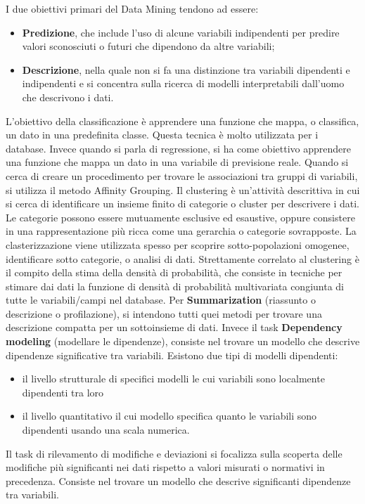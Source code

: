 \documentclass[a4paper]{extarticle}
\begin{document}
I due obiettivi primari del Data Mining tendono ad essere:

\begin{itemize}
\item \textbf{Predizione}, che include l'uso di alcune variabili indipendenti per predire valori sconosciuti o futuri che dipendono da altre variabili;
\item \textbf{Descrizione}, nella quale non si fa una distinzione tra variabili dipendenti e indipendenti e si concentra sulla ricerca di modelli interpretabili dall'uomo che descrivono i dati.
\end{itemize}

L'obiettivo della classificazione è apprendere una funzione che mappa, o classifica, un dato in una predefinita classe. Questa tecnica è molto utilizzata per i database. Invece quando si parla di regressione, si ha come obiettivo apprendere una funzione che mappa un dato in una variabile di previsione reale. Quando  si cerca di creare un procedimento per trovare le associazioni tra gruppi di variabili, si utilizza il metodo Affinity Grouping. Il clustering è un'attività descrittiva in cui si cerca di identificare un insieme finito di categorie o cluster per descrivere i dati. Le categorie possono essere mutuamente esclusive ed esaustive, oppure consistere in una rappresentazione più ricca come una gerarchia o categorie sovrapposte. La clasterizzazione viene utilizzata spesso per scoprire sotto-popolazioni omogenee, identificare sotto categorie, o analisi di dati. Strettamente correlato al clustering è il compito della stima della densità di probabilità, che consiste in tecniche per stimare dai dati la funzione di densità di probabilità multivariata congiunta di tutte le variabili/campi nel database.
Per \textbf{Summarization} (riassunto o descrizione o profilazione), si intendono tutti quei metodi per trovare una descrizione compatta per un sottoinsieme di dati. Invece il task \textbf{Dependency modeling} (modellare le dipendenze), consiste nel trovare un modello che descrive dipendenze significative tra variabili. Esistono due tipi di modelli dipendenti:
\begin{itemize}
\item il livello strutturale di specifici modelli le cui variabili sono localmente dipendenti tra loro
\item il livello quantitativo il cui modello specifica quanto le variabili sono dipendenti usando una scala numerica.
\end{itemize}
Il task di rilevamento di modifiche e deviazioni si focalizza sulla scoperta delle modifiche più significanti nei dati rispetto a valori misurati o normativi in precedenza. Consiste nel trovare un modello che descrive significanti dipendenze tra variabili.
\end{document}
